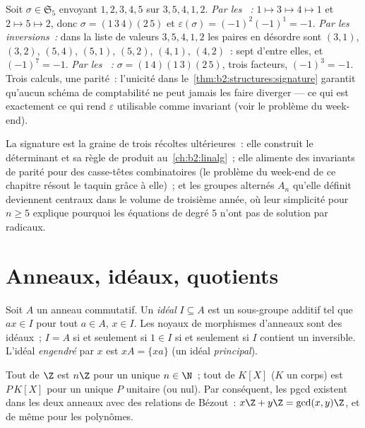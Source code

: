 \begin{example}\label{ex:b2:structures:threeroads}
Soit $\sigma \in \mathfrak{S}_5$ envoyant $1, 2, 3, 4, 5$ sur $3, 5,
4, 1, 2$. \emph{Par les ~:} $1 \mapsto 3 \mapsto 4 \mapsto 1$
et $2 \mapsto 5 \mapsto 2$, donc $\sigma = (1\,3\,4)(2\,5)$ et
$\varepsilon(\sigma) = (-1)^{2}(-1)^{1} = -1$. \emph{Par les
inversions~:} dans la liste de valeurs $3, 5, 4, 1, 2$ les paires en
désordre sont $(3,1)$, $(3,2)$, $(5,4)$, $(5,1)$, $(5,2)$, $(4,1)$,
$(4,2)$~: sept d'entre elles, et $(-1)^7 = -1$. \emph{Par les
~:} $\sigma = (1\,4)(1\,3)(2\,5)$, trois facteurs,
$(-1)^3 = -1$. Trois calculs, une parité~: l'unicité dans
le~\cref{thm:b2:structures:signature} garantit qu'aucun schéma de
comptabilité ne peut jamais les faire diverger --- ce qui est
exactement ce qui rend $\varepsilon$ utilisable comme invariant
(voir le problème du week-end).
\end{example}

\begin{remark}
La signature est la graine de trois récoltes ultérieures~: elle
construit le déterminant et sa règle de produit au~\cref{ch:b2:linalg}~;
elle alimente des invariants de parité pour des casse-têtes
combinatoires (le problème du week-end de ce chapitre résout le
taquin grâce à elle)~; et les groupes alternés $A_n$ qu'elle définit
deviennent centraux dans le volume de troisième année, où leur
simplicité pour $n \geq 5$ explique pourquoi les équations de degré
$5$ n'ont pas de solution par radicaux.
\end{remark}

\section{Anneaux, idéaux, quotients}

\begin{definition}[Idéal]\label{def:b2:structures:ideal}
Soit $A$ un anneau commutatif. Un \emph{idéal} $I
\subseteq A$ est un sous-groupe additif tel que $a x \in I$ pour tout
$a \in A$, $x \in I$. Les noyaux de morphismes d'anneaux sont des
idéaux~; $I = A$ si et seulement si $1 \in I$ si et seulement si $I$
contient un inversible. L'idéal \emph{engendré} par $x$ est $xA =
\{xa\}$ (un idéal \emph{principal}).
\end{definition}

\begin{theorem}[{Idéaux de $\Z$ et de $K[X]$}]\label{thm:b2:structures:principal}
Tout  de $\Z$ est $n\Z$ pour un unique $n \in \N$~; tout  de
$K[X]$ ($K$ un corps) est $P\,K[X]$ pour un unique $P$ unitaire (ou
nul). Par conséquent, les pgcd existent dans les deux anneaux avec des
relations de Bézout~: $x\Z + y\Z = \gcd(x,y)\Z$, et de même pour les
polynômes.
\end{theorem}

